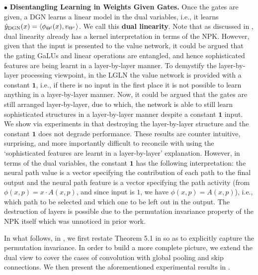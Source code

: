 $\bullet$ \textbf{Disentangling Learning in Weights Given Gates.} Once the gates are given, a DGN learns a linear model in the dual variables, i.e., it learns $\hat{y}_{\text{DGN}}(x)=\langle \phi_{\Theta^{\textrm{f}}}(x), v_{{\Theta}^{\text{v}}}\rangle$. We call this \textbf{dual linearity}. Note that as discussed in , dual linearity already has a kernel interpretation in terms of the NPK. However, given that the input is presented to the value network, it could be argued that the gating GaLUs and linear operations are entangled, and hence sophisticated features are being learnt in a layer-by-layer manner. To demystify the layer-by-layer processing viewpoint, in the LGLN the value network is provided with a constant $\mathbf{1}$, i.e., if there is no input in the first place it is not possible to learn anything in a layer-by-layer manner. Now, it could be argued that the gates are still arranged layer-by-layer, due to which, the network is able to still learn sophisticated structures in a layer-by-layer manner despite a constant $\mathbf{1}$ input. We show via experiments in  that destroying the layer-by-layer structure and the constant $\mathbf{1}$ does not degrade performance. These results are counter intuitive, surprising, and more importantly difficult to reconcile with using the `sophisticated features are learnt in a layer-by-layer' explanation. However, in terms of the dual variables, the constant $\mathbf{1}$ has the following interpretation: the neural path value is a vector specifying the contribution of each path to the final output and the neural path feature is a vector specifying the path activity (from  $\phi(x,p)=x\cdot A(x,p)$, and since input is $1$, we have $\phi(x,p)=A(x,p)$), i.e., which path to be selected and which one to be left out in the output. The destruction of layers is possible due to the permutation invariance property of the NPK itself which was unnoticed in prior work. 

In what follows, in , we first restate Theorem 5.1 in \cite{npk} so as to explicitly capture the permutation invariance. In order to build a  more complete picture, we extend the dual view to cover the cases of convolution with global pooling and skip connections. We then present the aforementioned experimental results in .





